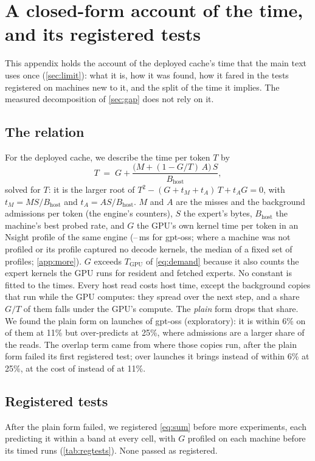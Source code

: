 \section{A closed-form account of the time, and its registered tests}\label{app:relation}
This appendix holds the account of the deployed cache's time that the main text uses once (\cref{sec:limit}): what it is, how it was found, how it fared in the tests registered on machines new to it, and the split of the time it implies. The measured decomposition of \cref{sec:gap} does not rely on it.

\subsection{The relation}
For the deployed cache, we describe the time per token $T$ by
\begin{equation}
T \;=\; G + \frac{\big(M + (1 - G/T)\,A\big)\,S}{B_{\mathrm{host}}},
\label{eq:sum}
\end{equation}
solved for $T$: it is the larger root of $T^2-(G+t_M+t_A)\,T+t_A G=0$, with $t_M=MS/B_{\mathrm{host}}$ and
$t_A=AS/B_{\mathrm{host}}$. $M$ and $A$ are the misses and the background admissions per token (the engine's counters), $S$ the
expert's bytes, $B_{\mathrm{host}}$ the machine's best probed rate, and $G$ the GPU's own kernel time per token in an
Nsight profile of the same engine (\slGprofMin--\slGprofMax\,ms for gpt-oss; where a machine was not profiled or its profile captured no
decode kernels, the median of a fixed set of \jmFallbackHosts{} profiles; \cref{app:more}). $G$ exceeds $T_{\text{GPU}}$ of
\cref{eq:demand} because it also counts the expert kernels the GPU runs for resident and fetched experts. No constant is
fitted to the times. Every
host read costs host time, except the background copies that run while the GPU computes: they spread over the next step,
and a share $G/T$ of them falls under the GPU's compute. The \emph{plain} form drops that share. We found the plain form
on \slLawN{} launches of gpt-oss (exploratory): it is within 6\% on \slLawWithinLow{} of them at 11\% but over-predicts at
25\%, where admissions are a larger share of the reads. The overlap term came from where those copies run, after the
plain form failed its first registered test; over \slOlN{} launches it brings \slOlWithinMid{} instead of
\slPlWithinMid{} within 6\% at 25\%, at the cost of \slOlWithinLow{} instead of \slPlWithinLow{} at 11\%.

\subsection{Registered tests}
After the plain form failed, we registered \cref{eq:sum} before \rtLaterN{} more experiments, each predicting it within a band at every cell, with
$G$ profiled on each machine before its timed runs (\cref{tab:regtests}). None passed as registered.

